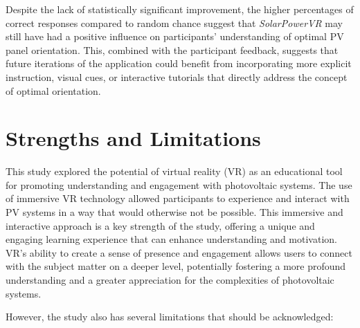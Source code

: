 \documentclass[draft, final]{vutinfth} %
\begin{document}
Despite the lack of statistically significant improvement, the higher percentages of correct responses compared to random chance suggest that \textit{SolarPowerVR} may still have had a positive influence on participants' understanding of optimal PV panel orientation. This, combined with the participant feedback, suggests that future iterations of the application could benefit from incorporating more explicit instruction, visual cues, or interactive tutorials that directly address the concept of optimal orientation.

\section{Strengths and Limitations}

This study explored the potential of virtual reality (VR) as an educational tool for promoting understanding and engagement with photovoltaic systems.  The use of immersive VR technology allowed participants to experience and interact with PV systems in a way that would otherwise not be possible. This immersive and interactive approach is a key strength of the study, offering a unique and engaging learning experience that can enhance understanding and motivation.  VR's ability to create a sense of presence and engagement \cite{Winn2002Immersion, HuAu2018VrExperience} allows users to connect with the subject matter on a deeper level, potentially fostering a more profound understanding and a greater appreciation for the complexities of photovoltaic systems.

However, the study also has several limitations that should be acknowledged:
\end{document}
